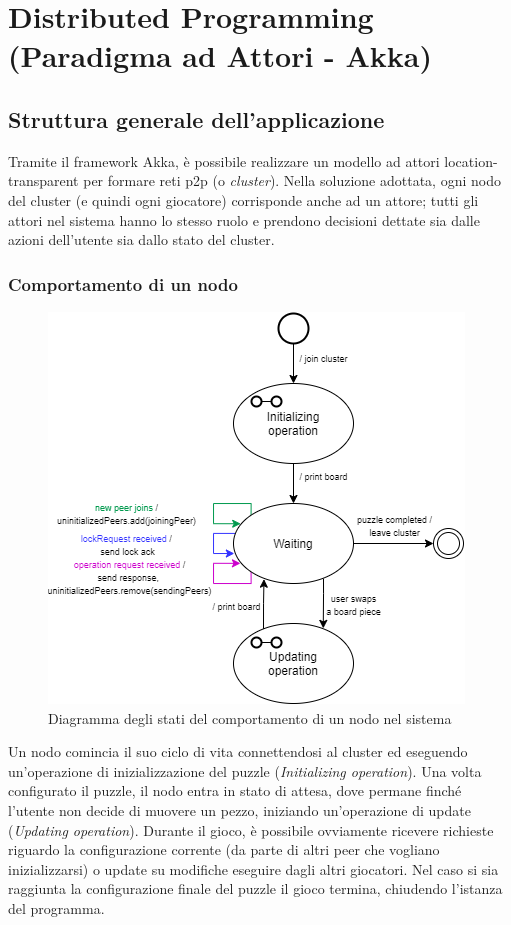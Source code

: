 \chapter{Distributed Programming (Paradigma ad Attori - Akka)}
\section{Struttura generale dell'applicazione} \label{akka}
Tramite il framework Akka, è possibile realizzare un modello ad attori location-transparent per formare reti p2p (o \textit{cluster}).\newline
\noindent Nella soluzione adottata, ogni nodo del cluster (e quindi ogni giocatore) corrisponde anche ad un attore; tutti gli attori nel sistema hanno lo stesso ruolo e prendono decisioni dettate sia dalle azioni dell'utente sia dallo stato del cluster.
\subsection{Comportamento di un nodo}
\begin{figure}[H]
	\begin{center}
		\includegraphics[width=0.6\linewidth]{img/part-2/akka.png}
	\end{center}
	\caption{Diagramma degli stati del comportamento di un nodo nel sistema}
\end{figure}
Un nodo comincia il suo ciclo di vita connettendosi al cluster ed eseguendo un'operazione di inizializzazione del puzzle (\textit{Initializing operation}).\newline
Una volta configurato il puzzle, il nodo entra in stato di attesa, dove permane finché l'utente non decide di muovere un pezzo, iniziando un'operazione di update (\textit{Updating operation}).\newline
Durante il gioco, è possibile ovviamente ricevere richieste riguardo la configurazione corrente (da parte di altri peer che vogliano inizializzarsi) o update su modifiche eseguire dagli altri giocatori.\newline
Nel caso si sia raggiunta la configurazione finale del puzzle il gioco termina, chiudendo l'istanza del programma.\newline

